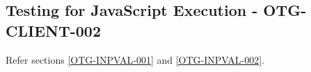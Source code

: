 \subsection{Testing for JavaScript Execution - OTG-CLIENT-002}
Refer sections \ref{OTG-INPVAL-001} and \ref{OTG-INPVAL-002}.
\clearpage
